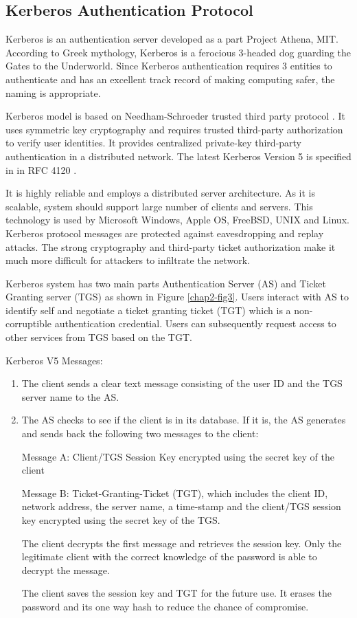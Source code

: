 \begin{multicols}{2}
\section*{Kerberos Authentication Protocol}

Kerberos is an authentication server developed as a part Project Athena, MIT. According to Greek mythology, Kerberos is a ferocious 3-headed dog guarding the Gates to the Underworld. Since Kerberos authentication requires 3 entities to authenticate and has an excellent track record of making computing safer, the naming is appropriate. 

Kerberos model is based on Needham-Schroeder trusted third party protocol \cite{chap2-key1}. It uses symmetric key cryptography and requires trusted third-party authorization to verify user identities. It provides centralized private-key third-party authentication in a distributed network. The latest Kerberos Version 5 is specified in in RFC 4120 \cite{chap2-key12}.

It is highly reliable and employs a distributed server architecture. As it is scalable, system should support large number of clients and servers. This technology is used by Microsoft Windows, Apple OS, FreeBSD, UNIX and Linux. Kerberos protocol messages are protected against eavesdropping and replay attacks. The strong cryptography and third-party ticket authorization make it much more difficult for attackers to infiltrate the network.

Kerberos system has two main parts Authentication Server (AS) and Ticket Granting server (TGS) as shown in Figure \ref{chap2-fig3}. Users interact with AS to identify self and negotiate a ticket granting ticket (TGT) which is a non-corruptible authentication credential. Users can subsequently request access to other services from TGS based on the TGT.

Kerberos V5 Messages:
\begin{enumerate}
\item The client sends a clear text message consisting of the user ID and the TGS server name to the AS.
\item The AS checks to see if the client is in its database. If it is, the AS generates and sends back the following two messages to the client:

Message A: Client/TGS Session Key encrypted using the secret key of the client

Message B: Ticket-Granting-Ticket (TGT), which includes the client ID, network address, the server name, a time-stamp and the client/TGS session key encrypted using the secret key of the TGS.

The client decrypts the first message and retrieves the session key. Only the legitimate client with the correct knowledge of the password is able to decrypt the message.

The client saves the session key and TGT for the future use. It erases the password and its one way hash to reduce the chance of compromise.
\end{enumerate}
\end{multicols}

